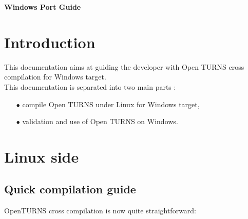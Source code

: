 \documentclass[11pt]{article}
\begin{document}
\begin{titlepage}
  \vspace*{2cm}
  \begin{center}
    {\huge \bf Windows Port Guide}
    
  \end{center}
\end{titlepage}
\newpage
\tableofcontents


\newpage

\section{Introduction}

This documentation aims at guiding the developer with Open TURNS cross compilation for Windows target.\\

This documentation is separated into two main parts :
\begin{itemize}
\item[$\bullet$]  compile Open TURNS under Linux for Windows target,
\item[$\bullet$]  validation and use of Open TURNS on Windows.
\end{itemize}

\newpage
\section{Linux side}

\subsection{Quick compilation guide}

OpenTURNS cross compilation is now quite straightforward: 
\end{document}
